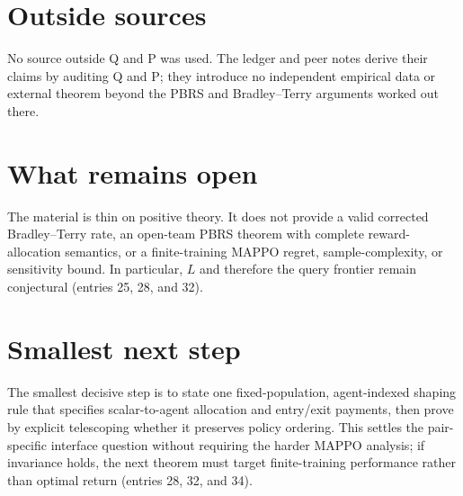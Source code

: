 \documentclass{article}
\begin{document}
\section*{Outside sources}
No source outside Q and P was used. The ledger and peer notes derive their claims by auditing Q and P; they introduce no independent empirical data or external theorem beyond the PBRS and Bradley--Terry arguments worked out there.

\section*{What remains open}
The material is thin on positive theory. It does not provide a valid corrected Bradley--Terry rate, an open-team PBRS theorem with complete reward-allocation semantics, or a finite-training MAPPO regret, sample-complexity, or sensitivity bound. In particular, \(L\) and therefore the query frontier remain conjectural (entries 25, 28, and 32).

\section*{Smallest next step}
The smallest decisive step is to state one fixed-population, agent-indexed shaping rule that specifies scalar-to-agent allocation and entry/exit payments, then prove by explicit telescoping whether it preserves policy ordering. This settles the pair-specific interface question without requiring the harder MAPPO analysis; if invariance holds, the next theorem must target finite-training performance rather than optimal return (entries 28, 32, and 34).
\end{document}
